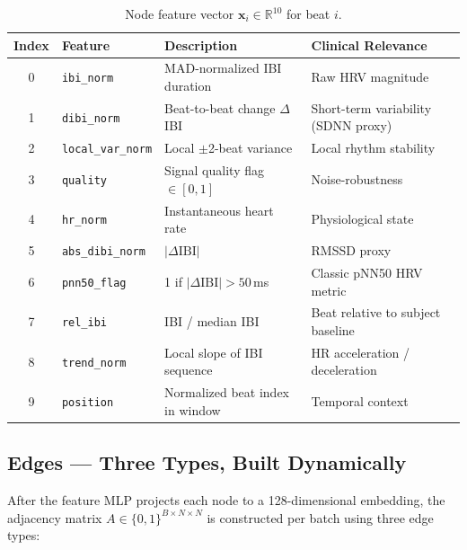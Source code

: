 \documentclass[11pt,a4paper]{article}
\begin{document}
\begin{table}[h!]
\centering
\renewcommand{\arraystretch}{1.3}
\begin{tabular}{clll}
\toprule
\textbf{Index} & \textbf{Feature} & \textbf{Description} & \textbf{Clinical Relevance} \\
\midrule
0 & \texttt{ibi\_norm}       & MAD-normalized IBI duration          & Raw HRV magnitude \\
1 & \texttt{dibi\_norm}      & Beat-to-beat change $\Delta$IBI      & Short-term variability (SDNN proxy) \\
2 & \texttt{local\_var\_norm}& Local $\pm$2-beat variance           & Local rhythm stability \\
3 & \texttt{quality}         & Signal quality flag $\in [0,1]$      & Noise-robustness \\
4 & \texttt{hr\_norm}        & Instantaneous heart rate             & Physiological state \\
5 & \texttt{abs\_dibi\_norm} & $|\Delta\text{IBI}|$                 & RMSSD proxy \\
6 & \texttt{pnn50\_flag}     & 1 if $|\Delta\text{IBI}|>50$\,ms    & Classic pNN50 HRV metric \\
7 & \texttt{rel\_ibi}        & IBI / median IBI                     & Beat relative to subject baseline \\
8 & \texttt{trend\_norm}     & Local slope of IBI sequence          & HR acceleration / deceleration \\
9 & \texttt{position}        & Normalized beat index in window      & Temporal context \\
\bottomrule
\end{tabular}
\caption{Node feature vector $\mathbf{x}_i \in \mathbb{R}^{10}$ for beat $i$.}
\end{table}

\subsection{Edges --- Three Types, Built Dynamically}

After the feature MLP projects each node to a 128-dimensional embedding, the adjacency matrix
$A \in \{0,1\}^{B \times N \times N}$ is constructed per batch using three edge types:
\end{document}
